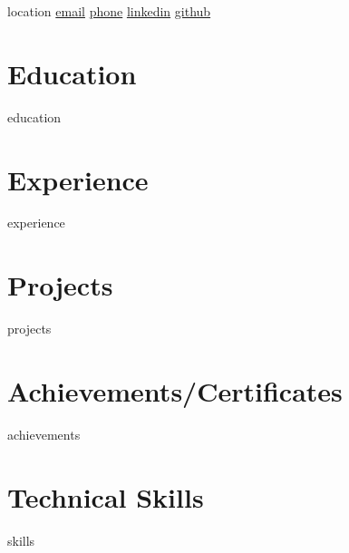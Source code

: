 \documentclass[10pt, letterpaper]{article}
\newenvironment{header}{
\setlength{\topsep}{0pt}\par\kern\topsep\centering\linespread{1.5}
}{
\par\kern\topsep
}
\newcommand{\AND}{\unskip\hspace{5pt}\textbar\hspace{5pt}}
\begin{document}
\begin{header}
\fontsize{25pt}{25pt}

\vspace{5pt}

\normalsize
\mbox{{{{location}}}}%
\AND%
\href{mailto:{{{email}}}}{{{email}}}%
\AND%
\href{tel:{{{phone}}}}{{{phone}}}%
\AND%
\href{{{{linkedin}}}}{{{{linkedin}}}}%
\AND%
\href{{{{github}}}}{{{{github}}}}%

\end{header}

\vspace{5pt}

\section{Education}
{{{education}}}

\section*{Experience}
{{{experience}}}

\section{Projects}
{{{projects}}}

\section{Achievements/Certificates}
{{{achievements}}}

\section{Technical Skills}
{{{skills}}}
\end{document}
